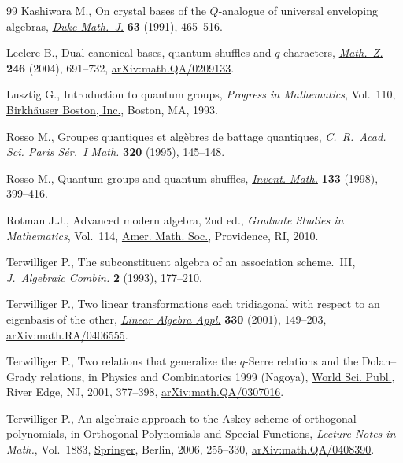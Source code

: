 \documentclass[pdftex]{sigma}
\numberwithin{equation}{section}
\begin{document}
\begin{thebibliography}{99}
Kashiwara M., On crystal bases of the {$Q$}-analogue of universal enveloping
 algebras, \href{https://doi.org/10.1215/S0012-7094-91-06321-0}{\textit{Duke Math.~J.}} \textbf{63} (1991), 465--516.

Leclerc B., Dual canonical bases, quantum shuffles and {$q$}-characters,
 \href{https://doi.org/10.1007/s00209-003-0609-9}{\textit{Math.~Z.}} \textbf{246} (2004), 691--732, \href{https://arxiv.org/abs/math.QA/0209133}{arXiv:math.QA/0209133}.

Lusztig G., Introduction to quantum groups, \textit{Progress in Mathematics},
 Vol.~110, \href{https://doi.org/10.1007/978-0-8176-4717-9}{Birkh\"{a}user Boston, Inc.}, Boston, MA, 1993.

Rosso M., Groupes quantiques et alg\`ebres de battage quantiques,
 \textit{C.~R.~Acad. Sci. Paris S\'er.~I Math.} \textbf{320} (1995),
 145--148.

Rosso M., Quantum groups and quantum shuffles, \href{https://doi.org/10.1007/s002220050249}{\textit{Invent. Math.}} \textbf{133} (1998), 399--416.

Rotman J.J., Advanced modern algebra, 2nd ed., \textit{Graduate Studies in Mathematics},
 Vol.~114, \href{https://doi.org/10.1090/gsm/114}{Amer. Math. Soc.}, Providence, RI, 2010.

Terwilliger P., The subconstituent algebra of an association scheme.~{III},
 \href{https://doi.org/10.1023/A:1022415825656}{\textit{J.~Algebraic Combin.}} \textbf{2} (1993), 177--210.

Terwilliger P., Two linear transformations each tridiagonal with respect to an
 eigenbasis of the other, \href{https://doi.org/10.1016/S0024-3795(01)00242-7}{\textit{Linear Algebra Appl.}} \textbf{330} (2001),
 149--203, \href{https://arxiv.org/abs/math.RA/0406555}{arXiv:math.RA/0406555}.

Terwilliger P., Two relations that generalize the {$q$}-{S}erre relations and
 the {D}olan--{G}rady relations, in Physics and Combinatorics 1999 ({N}agoya),
 \href{https://doi.org/10.1142/9789812810199_0013}{World Sci. Publ.}, River Edge, NJ, 2001, 377--398, \href{https://arxiv.org/abs/math.QA/0307016}{arXiv:math.QA/0307016}.

Terwilliger P., An algebraic approach to the {A}skey scheme of orthogonal
 polynomials, in Orthogonal Polynomials and Special Functions, \textit{Lecture
 Notes in Math.}, Vol.~1883, \href{https://doi.org/10.1007/978-3-540-36716-1_6}{Springer}, Berlin, 2006, 255--330,
 \href{https://arxiv.org/abs/math.QA/0408390}{arXiv:math.QA/0408390}.


\end{thebibliography}
\end{document}
